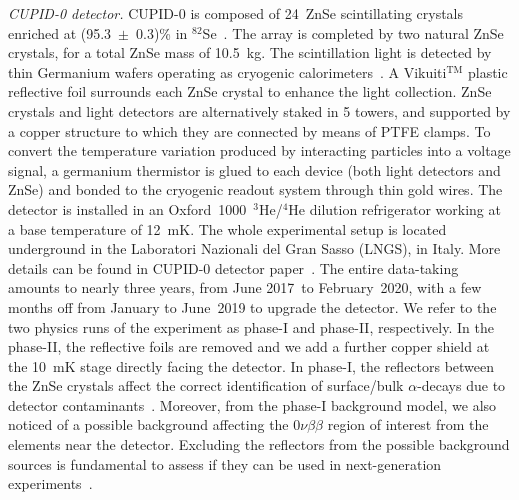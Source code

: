 \documentclass[%
reprint,
superscriptaddress,
altaffilletter,
showpacs,
showkeys,
amsmath, amssymb, aps,prl, floatfix
]{revtex4-1}
\newcommand{\startDAQ}{June 2017}
\newcommand{\onu}{$0\nu\beta \beta$\xspace}
\newcommand{\phone}{phase-I\xspace}
\newcommand{\phtwo}{phase-II\xspace}
\begin{document}
{\it CUPID-0 detector.} CUPID-0 is composed of 24~ZnSe scintillating crystals~\cite{Dafinei:2017xpc} enriched at (95.3~$\pm$~0.3)\% in $^{82}$Se~\cite{Balabanov:2023tnj}.
The array is completed by two natural ZnSe crystals, for a total ZnSe mass of 10.5~kg. 
The scintillation light is detected by thin Germanium wafers operating as cryogenic calorimeters~\cite{Beeman:2013zva}.
A Vikuiti$^{\text{TM}}$ plastic reflective foil surrounds each ZnSe crystal to enhance the light collection. 
ZnSe crystals and light detectors are alternatively staked in 5 towers, and supported by a copper structure to which they are connected by means of PTFE clamps. 
To convert the temperature variation produced by interacting particles into a voltage signal, a germanium thermistor is glued to each device (both light detectors and ZnSe) and bonded to the cryogenic readout system through thin gold wires. 
The detector is installed in an Oxford~1000~$^3$He/$^4$He dilution refrigerator working at a base temperature of 12~mK. The whole experimental setup is located underground in the Laboratori Nazionali del Gran Sasso (LNGS), in Italy. 
More details can be found in CUPID-0 detector paper~\cite{Azzolini:2018tum}.
The entire data-taking amounts to nearly three years, from \startDAQ~to February~2020, with a few months off from January to June~2019 to upgrade the detector. We refer to the two physics runs of the experiment as \phone and \phtwo, respectively.
In the \phtwo, the reflective foils are removed and we add a further copper shield at the 10~mK stage directly facing the detector. In \phone, the reflectors between the ZnSe crystals affect the correct identification of surface/bulk $\alpha$-decays due to detector contaminants~\cite{Azzolini:2021yft}. Moreover, from the \phone background model, we also noticed of a possible background affecting the \onu region of interest from the elements near the detector. 
Excluding the reflectors from the possible background sources is fundamental to assess if they can be used in next-generation experiments~\cite{CUPID:2020itw}.
\end{document}
